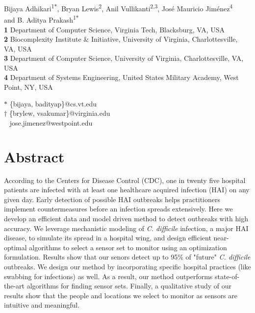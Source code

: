 \documentclass[10pt,letterpaper]{article}
\begin{document}
\vspace*{0.2in}

\begin{flushleft}
{\Large
\textbf{}
}\newline

		Bijaya Adhikari\textsuperscript{1$\ast$},
Bryan Lewis\textsuperscript{2\dag},
Anil Vullikanti\textsuperscript{2,3\dag},
José Mauricio Jiménez\textsuperscript{4\textsection} \\ and  
B. Aditya Prakash\textsuperscript{1$\ast$}
\\
\bigskip
\textbf{1} Department of Computer Science, Virginia Tech, Blacksburg, VA, USA \\
\textbf{2} Biocomplexity Institute \& Initiative, University of Virginia, Charlottesville, VA, USA \\
\textbf{3} Department of Computer Science, University of Virginia, Charlottesville, VA, USA \\
\textbf{4} Department of Systems Engineering, United States Military Academy, West Point, NY, USA\\
\bigskip


$\ast$ \{bijaya, badityap\}@cs.vt.edu\\
$\dag$ \{brylew, vsakumar\}@virginia.edu\\
\textsection~ jose.jimenez@westpoint.edu 

\end{flushleft}
\section*{Abstract}
According to the Centers for Disease Control (CDC), one in twenty five hospital patients are infected with at least one healthcare acquired infection (HAI) on any given day. Early detection of possible HAI outbreaks helps practitioners implement countermeasures before an infection spreads extensively. Here we develop an efficient data and model driven method to detect outbreaks with high accuracy. We leverage mechanistic modeling of \textit{C. difficile} infection, a major HAI disease, to simulate its spread in a hospital wing,
and design efficient near-optimal algorithms to select a sensor set to monitor using an optimization formulation. Results show that our senors detect up to 95\% of "future" \textit{C. difficile} outbreaks. We design our method by incorporating specific hospital practices (like swabbing for infections) as well. As a result, our method outperforms state-of-the-art algorithms for finding sensor sets. Finally, a qualitative study of our results show that the people and locations we select to monitor as sensors are intuitive and meaningful.
\end{document}
